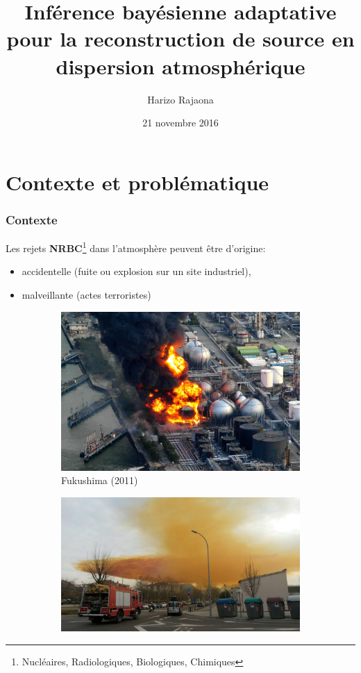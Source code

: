 \documentclass{beamer}
\title{Inférence bayésienne adaptative pour la reconstruction de source en dispersion atmosphérique}
\author{Harizo Rajaona}
\institute{CrisTaL - CEA - Aria Technologies}
\date{21 novembre 2016}
\begin{document}
\AtBeginSection[]
{
	\begin{frame}
		\tableofcontents[currentsection]
	\end{frame}
}
	
	
\begin{frame}
	\titlepage
\end{frame}
\begin{frame}
	\tableofcontents
\end{frame}

\section{Contexte et problématique}

\begin{frame}
	\frametitle{Contexte}
	Les rejets \textbf{NRBC}\footnote{Nucléaires, Radiologiques, Biologiques, Chimiques} dans l'atmosphère peuvent être d'origine:
	\begin{itemize}
		\item accidentelle (fuite ou explosion sur un site industriel),
		\item malveillante (actes terroristes)
	\end{itemize}
	\begin{figure}
		\centering
		\begin{subfigure}[b]{0.33\textwidth}
			\centering
			\includegraphics[width=\textwidth]{fukushima}
			\caption*{Fukushima (2011)}
		\end{subfigure}
		\hfill
		\begin{subfigure}[b]{0.3\textwidth}
			\centering
			\includegraphics[width=\textwidth]{igualada}

\end{subfigure}
\end{figure}
\end{frame}
\end{document}
